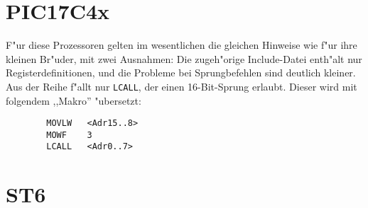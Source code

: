 \documentclass[12pt,a4paper,twoside]{report}
\newcommand{\tty}[1]{{\tt #1}}
\begin{document}

\section{PIC17C4x}

F"ur diese Prozessoren gelten im wesentlichen die gleichen Hinweise wie
f"ur ihre kleinen Br"uder, mit zwei Ausnahmen: Die zugeh"orige Include-Datei
enth"alt nur Registerdefinitionen, und die Probleme bei Sprungbefehlen
sind deutlich kleiner.  Aus der Reihe f"allt nur \tty{LCALL}, der einen
16-Bit-Sprung erlaubt.  Dieser wird mit folgendem ,,Makro'' "ubersetzt:
\begin{verbatim}
        MOVLW   <Adr15..8>
        MOWF    3
        LCALL   <Adr0..7>
\end{verbatim}


\section{ST6}
\end{document}
